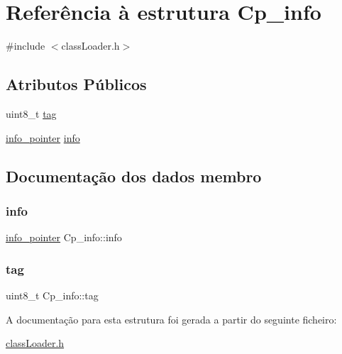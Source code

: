 \hypertarget{struct_cp__info}{}\section{Referência à estrutura Cp\+\_\+info}
\label{struct_cp__info}


{\ttfamily \#include $<$class\+Loader.\+h$>$}

\subsection*{Atributos Públicos}
\begin{DoxyCompactItemize}
\item 
uint8\+\_\+t \hyperlink{struct_cp__info_a9a89e4427cda96810c4b6d11b966f50d}{tag}
\item 
\hyperlink{unioninfo__pointer}{info\+\_\+pointer} \hyperlink{struct_cp__info_a705b184b032d6962d3d23b16039cdc56}{info}
\end{DoxyCompactItemize}


\subsection{Documentação dos dados membro}
\hypertarget{struct_cp__info_a705b184b032d6962d3d23b16039cdc56}{}\label{struct_cp__info_a705b184b032d6962d3d23b16039cdc56} 
\subsubsection{\texorpdfstring{info}{info}}
{\footnotesize\ttfamily \hyperlink{unioninfo__pointer}{info\+\_\+pointer} Cp\+\_\+info\+::info}

\hypertarget{struct_cp__info_a9a89e4427cda96810c4b6d11b966f50d}{}\label{struct_cp__info_a9a89e4427cda96810c4b6d11b966f50d} 
\subsubsection{\texorpdfstring{tag}{tag}}
{\footnotesize\ttfamily uint8\+\_\+t Cp\+\_\+info\+::tag}



A documentação para esta estrutura foi gerada a partir do seguinte ficheiro\+:\begin{DoxyCompactItemize}
\item 
\hyperlink{class_loader_8h}{class\+Loader.\+h}\end{DoxyCompactItemize}
